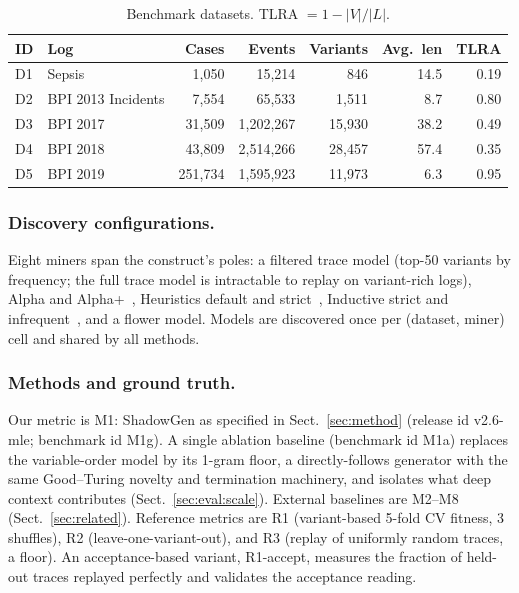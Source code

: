 \documentclass[runningheads]{llncs}
\newcommand{\chg}[1]{\textcolor{chgblue}{#1}}
\begin{document}
\begin{table}[t]
\centering
\caption{Benchmark datasets. TLRA $=1-|V|/|L|$.}
\label{tab:datasets}
\setlength{\tabcolsep}{3pt}
\footnotesize
\begin{tabular}{@{}llrrrrr@{}}
\toprule
ID & Log & Cases & Events & Variants & Avg.\ len & TLRA \\
\midrule
D1 & Sepsis~\cite{mannhardt2016sepsis} & 1{,}050 & 15{,}214 & 846 & 14.5 & 0.19 \\
D2 & BPI 2013 Incidents & 7{,}554 & 65{,}533 & 1{,}511 & 8.7 & 0.80 \\
D3 & BPI 2017 & 31{,}509 & 1{,}202{,}267 & 15{,}930 & 38.2 & 0.49 \\
D4 & BPI 2018 & 43{,}809 & 2{,}514{,}266 & 28{,}457 & 57.4 & 0.35 \\
D5 & BPI 2019 & 251{,}734 & 1{,}595{,}923 & 11{,}973 & 6.3 & 0.95 \\
\bottomrule
\end{tabular}
\end{table}

\subsubsection{Discovery configurations.}
Eight miners span the construct's poles: a filtered trace model (top-50 variants by frequency; the full trace model is intractable to replay on variant-rich logs), Alpha and Alpha+~\cite{vanderaalst2004alpha}, Heuristics default and strict~\cite{weijters2006hm}, Inductive strict and infrequent~\cite{leemans2013im,leemans2014imf}, and a flower model. Models are discovered once per (dataset, miner) cell and shared by all methods.

\subsubsection{Methods and ground truth.}
\chg{Our metric is M1: ShadowGen as specified in Sect.~\ref{sec:method} (release id v2.6-mle; benchmark id M1g). A single ablation baseline (benchmark id M1a) replaces the variable-order model by its 1-gram floor, a directly-follows generator with the same Good--Turing novelty and termination machinery, and isolates what deep context contributes (Sect.~\ref{sec:eval:scale}).} External baselines are M2--M8 (Sect.~\ref{sec:related}). Reference metrics are R1 (variant-based 5-fold CV fitness, 3 shuffles), R2 (leave-one-variant-out), and R3 (replay of uniformly random traces, a floor). An acceptance-based variant, R1-accept, measures the fraction of held-out traces replayed perfectly and validates the acceptance reading.
\end{document}
